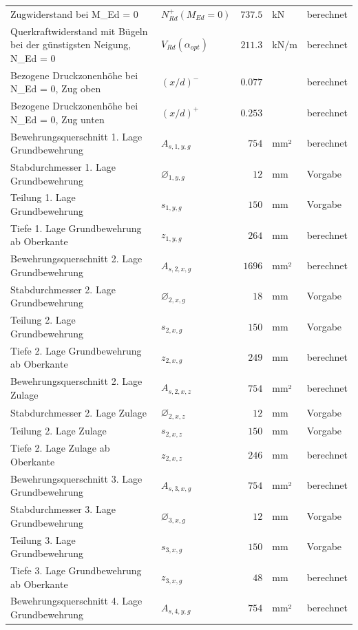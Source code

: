 \documentclass[11pt,a4paper]{article}
\begin{document}
\begin{xltabular}{\linewidth}{>{\raggedright\arraybackslash}Xlrll}
Zugwiderstand bei M\_Ed = 0 & $N_{Rd}^{+}(M_{Ed} = 0)$ & $737.5$ & kN & berechnet \\
Querkraftwiderstand mit Bügeln bei der günstigsten Neigung, N\_Ed = 0 & $V_{Rd}(\alpha_{opt})$ & $211.3$ & kN/m & berechnet \\
Bezogene Druckzonenhöhe bei N\_Ed = 0, Zug oben & $\left(x/d\right)^{-}$ & $0.077$ &  & berechnet \\
Bezogene Druckzonenhöhe bei N\_Ed = 0, Zug unten & $\left(x/d\right)^{+}$ & $0.253$ &  & berechnet \\
Bewehrungsquerschnitt 1. Lage Grundbewehrung & $A_{s,1,y,g}$ & $754$ & mm² & berechnet \\
Stabdurchmesser 1. Lage Grundbewehrung & $\varnothing_{1,y,g}$ & $12$ & mm & Vorgabe \\
Teilung 1. Lage Grundbewehrung & $s_{1,y,g}$ & $150$ & mm & Vorgabe \\
Tiefe 1. Lage Grundbewehrung ab Oberkante & $z_{1,y,g}$ & $264$ & mm & berechnet \\
Bewehrungsquerschnitt 2. Lage Grundbewehrung & $A_{s,2,x,g}$ & $1696$ & mm² & berechnet \\
Stabdurchmesser 2. Lage Grundbewehrung & $\varnothing_{2,x,g}$ & $18$ & mm & Vorgabe \\
Teilung 2. Lage Grundbewehrung & $s_{2,x,g}$ & $150$ & mm & Vorgabe \\
Tiefe 2. Lage Grundbewehrung ab Oberkante & $z_{2,x,g}$ & $249$ & mm & berechnet \\
Bewehrungsquerschnitt 2. Lage Zulage & $A_{s,2,x,z}$ & $754$ & mm² & berechnet \\
Stabdurchmesser 2. Lage Zulage & $\varnothing_{2,x,z}$ & $12$ & mm & Vorgabe \\
Teilung 2. Lage Zulage & $s_{2,x,z}$ & $150$ & mm & Vorgabe \\
Tiefe 2. Lage Zulage ab Oberkante & $z_{2,x,z}$ & $246$ & mm & berechnet \\
Bewehrungsquerschnitt 3. Lage Grundbewehrung & $A_{s,3,x,g}$ & $754$ & mm² & berechnet \\
Stabdurchmesser 3. Lage Grundbewehrung & $\varnothing_{3,x,g}$ & $12$ & mm & Vorgabe \\
Teilung 3. Lage Grundbewehrung & $s_{3,x,g}$ & $150$ & mm & Vorgabe \\
Tiefe 3. Lage Grundbewehrung ab Oberkante & $z_{3,x,g}$ & $48$ & mm & berechnet \\
Bewehrungsquerschnitt 4. Lage Grundbewehrung & $A_{s,4,y,g}$ & $754$ & mm² & berechnet \\

\end{xltabular}
\end{document}
